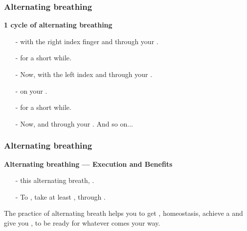 \begin{frame}
  \frametitle{Alternating breathing}
  
  \textbf{1 cycle of alternating breathing}
  \vspace{5mm}

  \begin{itemize}
  \item[-]  with the right index finger and  through your .
  \item[-]  for a short while.
  \item[-] Now,  with the left index and  through your .
  \item[-]  on your .
  \item[-]  for a short while.
  \item[-] Now,  and  through your . And so on...
\end{itemize}
  
  
  \end{frame}
\begin{frame}
  \frametitle{Alternating breathing}

  \textbf{Alternating breathing --- Execution and Benefits}
  \vspace{5mm}

  
  \begin{itemize}
    
  \item[-]  this alternating breath, .
    \item[-] To , take at least ,  through .
\end{itemize}

  \vspace{5 mm}
  
  The practice of alternating breath helps you to get ,
  homeostasis, achieve a  and give you , to be ready for whatever comes your way.
  
  \end{frame}

